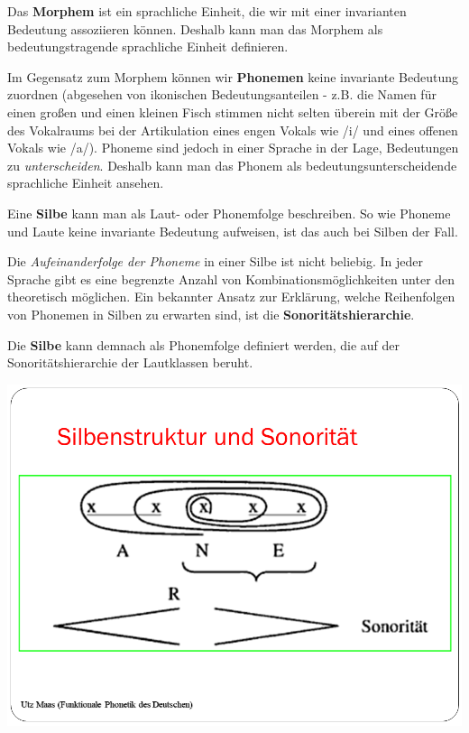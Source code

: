 \documentclass[
  letterpaper,
]{scrbook}
\begin{document}
Das \textbf{Morphem} ist ein sprachliche Einheit, die wir mit einer
invarianten Bedeutung assoziieren können. Deshalb kann man das Morphem
als bedeutungstragende sprachliche Einheit definieren.

Im Gegensatz zum Morphem können wir \textbf{Phonemen} keine invariante
Bedeutung zuordnen (abgesehen von ikonischen Bedeutungsanteilen - z.B.
die Namen für einen großen und einen kleinen Fisch stimmen nicht selten
überein mit der Größe des Vokalraums bei der Artikulation eines engen
Vokals wie /i/ und eines offenen Vokals wie /a/). Phoneme sind jedoch in
einer Sprache in der Lage, Bedeutungen zu \emph{unterscheiden}. Deshalb
kann man das Phonem als bedeutungsunterscheidende sprachliche Einheit
ansehen.

Eine \textbf{Silbe} kann man als Laut- oder Phonemfolge beschreiben. So
wie Phoneme und Laute keine invariante Bedeutung aufweisen, ist das auch
bei Silben der Fall.

Die \emph{Aufeinanderfolge der Phoneme} in einer Silbe ist nicht
beliebig. In jeder Sprache gibt es eine begrenzte Anzahl von
Kombinationsmöglichkeiten unter den theoretisch möglichen. Ein bekannter
Ansatz zur Erklärung, welche Reihenfolgen von Phonemen in Silben zu
erwarten sind, ist die \textbf{Sonoritätshierarchie}.

Die \textbf{Silbe} kann demnach als Phonemfolge definiert werden, die
auf der Sonoritätshierarchie der Lautklassen beruht.

\includegraphics[width=1\textwidth,height=\textheight]{./pictures/Wagner_Maas_Duden_Petric_3.PNG}
\end{document}

